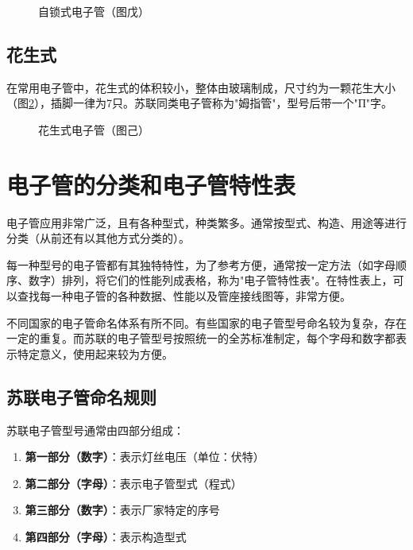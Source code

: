 \documentclass[12pt,UTF8]{ctexbook}
\begin{document}
\begin{figure}[htbp]
    \centering
    \caption{自锁式电子管（图戊）}
    \label{fig:self_locking_tube}
\end{figure}

\subsection{花生式}

在常用电子管中，花生式的体积较小，整体由玻璃制成，尺寸约为一颗花生大小（图\ref{fig:peanut_tube}），插脚一律为7只。苏联同类电子管称为"姆指管"，型号后带一个"П"字。

\begin{figure}[htbp]
    \centering
    \caption{花生式电子管（图己）}
    \label{fig:peanut_tube}
\end{figure}

\section{电子管的分类和电子管特性表}

电子管应用非常广泛，且有各种型式，种类繁多。通常按型式、构造、用途等进行分类（从前还有以其他方式分类的）。

每一种型号的电子管都有其独特特性，为了参考方便，通常按一定方法（如字母顺序、数字）排列，将它们的性能列成表格，称为"电子管特性表"。在特性表上，可以查找每一种电子管的各种数据、性能以及管座接线图等，非常方便。

不同国家的电子管命名体系有所不同。有些国家的电子管型号命名较为复杂，存在一定的重复。而苏联的电子管型号按照统一的全苏标准制定，每个字母和数字都表示特定意义，使用起来较为方便。

\subsection{苏联电子管命名规则}

苏联电子管型号通常由四部分组成：

\begin{enumerate}
    \item \textbf{第一部分（数字）}：表示灯丝电压（单位：伏特）
    \item \textbf{第二部分（字母）}：表示电子管型式（程式）
    \item \textbf{第三部分（数字）}：表示厂家特定的序号
    \item \textbf{第四部分（字母）}：表示构造型式
\end{enumerate}
\end{document}
